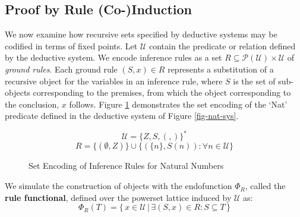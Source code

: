 \subsection{Proof by Rule (Co-)Induction}
We now examine how recursive sets specified by deductive systems may be codified in terms of fixed points. Let $\mathcal{U}$ contain the predicate or relation defined by the deductive system. We encode inference rules as a set $R \subseteq \mathcal{P}(\mathcal{U}) \times \mathcal{U}$ of \textit{ground rules}. Each ground rule $(S,x) \in R$ represents a substitution of a recursive object for the variables in an inference rule, where $S$ is the set of sub-objects corresponding to the premises, from which the object corresponding to the conclusion, $x$ follows. Figure \ref{fig-nat-ground-rules} demonstrates the set encoding of the `Nat' predicate defined in the deductive system of Figure \ref{fig-nat-sys}.

\begin{figure}
\caption{Set Encoding of Inference Rules for Natural Numbers}
\label{fig-nat-ground-rules}
$$\mathcal{U} = \{Z,S,(,)\}^*$$
$$R = \{(\emptyset,Z)\} \cup \{(\{n\},S(n)) : \forall n \in \mathcal{U}\}$$ 
\end{figure}

We simulate the construction of objects with the endofunction $\Phi_R$, called the \textbf{rule functional}, defined over the powerset lattice induced by $\mathcal{U}$ as:
$$\Phi_R(T) = \{\,x \in \mathcal{U} \,|\,\exists (S,x) \in R : S \subseteq T \,\}$$





